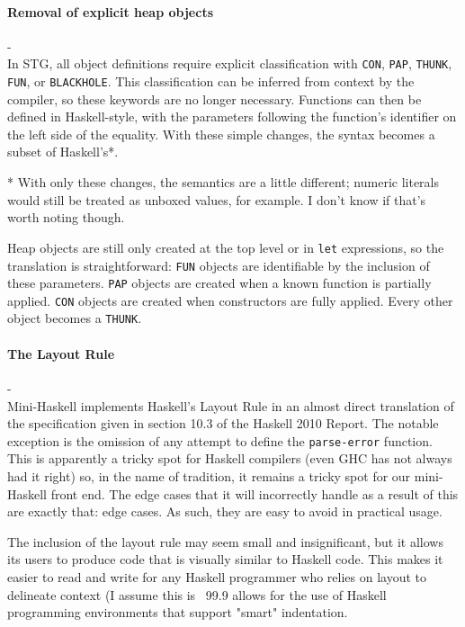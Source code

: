 \documentclass{llncs}
\begin{document}
\paragraph{Removal of explicit heap objects} -\\

In STG, all object definitions require explicit classification with
\texttt{CON}, \texttt{PAP}, \texttt{THUNK}, \texttt{FUN}, or
\texttt{BLACKHOLE}. This classification can be inferred from context by the
compiler, so these keywords are no longer necessary.  Functions can then be
defined in Haskell-style, with the parameters following the function's
identifier on the left side of the equality. With these simple changes, the
syntax becomes a subset of Haskell's*.

{\color{red}
* With only these changes, the semantics are a little different; numeric
  literals would still be treated as unboxed values, for example.  I don't know
  if that's worth noting though.}

Heap objects are still only created at the top level or in \texttt{let}
expressions, so the translation is straightforward: \texttt{FUN} objects are
identifiable by the inclusion of these parameters.  \texttt{PAP} objects are
created when a known function is partially applied.  \texttt{CON} objects are
created when constructors are fully applied.  Every other object becomes a
\texttt{THUNK}.



\paragraph{The Layout Rule} -\\

Mini-Haskell implements Haskell's Layout Rule in an almost direct translation of
the specification given in section 10.3 of the Haskell 2010 Report.  The notable
exception is the omission of any attempt to define the \texttt{parse-error}
function.  This is apparently a tricky spot for Haskell compilers (even GHC has
not always had it right) so, in the name of tradition, it remains a tricky spot
for our mini-Haskell front end.  The edge cases that it will incorrectly handle
as a result of this are exactly that: edge cases.  As such, they are easy to
avoid in practical usage.

The inclusion of the layout rule may seem small and insignificant, but it allows
its users to produce code that is visually similar to Haskell code.  This makes
it easier to read and write for any Haskell programmer who relies on layout to
delineate context (I assume this is ~99.9%
allows for the use of Haskell programming environments that support "smart"
indentation.
\end{document}
